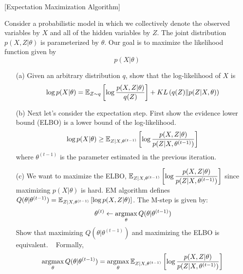 \item {} [Expectation Maximization Algorithm]

Consider a probabilistic model in which we collectively denote the observed variables by $X$ and all of the hidden variables by $Z$. The joint distribution $p(X,Z|\theta)$ is parameterized by $\theta$. Our goal is to maximize the likelihood function given by
$$p(X|\theta)$$

\begin{itemize}
\item[(a)] Given an arbitrary distribution $q$, show that the log-likelihood of $X$ is~
$$\log p(X|\theta) = \mathbb{E}_{Z\sim q}\left [\log\dfrac{p(X, Z|\theta)}{q(Z)}\right] + KL\left(q(Z)\| p(Z|X,\theta)\right)$$

\item[(b)] Next let's consider the expectation step. First show the evidence lower bound (ELBO) is a lower bound of the log-likelihood. ~
$$\log p(X|\theta)\geq\mathbb{E}_{Z|X,\theta^{(t-1)}}\left[\log\dfrac{p(X,Z|\theta)}{p(Z|X,\theta^{(t-1)})}\right]$$
where $\theta^{(t-1)}$ is the parameter estimated in the previous iteration.

\item[(c)] We want to maximize the ELBO, $\mathbb{E}_{Z|X,\theta^{(t-1)}}\left[\log \dfrac{p(X,Z|\theta)}{p(Z|X,\theta^{(t-1)})}\right]$ since maximizing $p(X|\theta)$ is hard. EM algorithm defines $Q(\theta|\theta^{(t-1)}) = \mathbb{E}_{Z|X,\theta^{(t-1)}}\left[ \log p(X,Z|\theta) \right]$. The M-step is given by:
$$\theta^{(t)} \leftarrow \mathop{\rm argmax}_{\theta} Q(\theta|\theta^{(t-1)})$$
Show that maximizing $Q(\theta|\theta^{(t-1)})$ and maximizing the ELBO is equivalent. ~ Formally,
$$\mathop{\rm argmax}_{\theta} Q(\theta|\theta^{(t-1)}) = \mathop{\rm argmax}_{\theta} \mathbb{E}_{Z|X,\theta^{(t-1)}}\left[\log \dfrac{p(X,Z|\theta)}{p(Z|X,\theta^{(t-1)})}\right]$$
\end{itemize}

\solution















\newpage